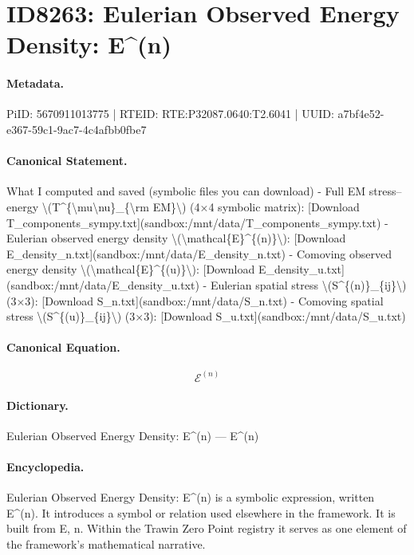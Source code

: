\section*{ID8263: Eulerian Observed Energy Density: E\textasciicircum{}(n)}
\paragraph{Metadata.}
PiID: 5670911013775 | RTEID: RTE:P32087.0640:T2.6041 | UUID: a7bf4e52-e367-59c1-9ac7-4c4afbb0fbe7

\paragraph{Canonical Statement.}
What I computed and saved (symbolic files you can download) - Full EM stress–energy \textbackslash{}(T\textasciicircum{}\{\textbackslash{}mu\textbackslash{}nu\}\_\{\textbackslash{}rm EM\}\textbackslash{}) (4×4 symbolic matrix): [Download T\_components\_sympy.txt](sandbox:/mnt/data/T\_components\_sympy.txt) - Eulerian observed energy density \textbackslash{}(\textbackslash{}mathcal\{E\}\textasciicircum{}\{(n)\}\textbackslash{}): [Download E\_density\_n.txt](sandbox:/mnt/data/E\_density\_n.txt) - Comoving observed energy density \textbackslash{}(\textbackslash{}mathcal\{E\}\textasciicircum{}\{(u)\}\textbackslash{}): [Download E\_density\_u.txt](sandbox:/mnt/data/E\_density\_u.txt) - Eulerian spatial stress \textbackslash{}(S\textasciicircum{}\{(n)\}\_\{ij\}\textbackslash{}) (3×3): [Download S\_n.txt](sandbox:/mnt/data/S\_n.txt) - Comoving spatial stress \textbackslash{}(S\textasciicircum{}\{(u)\}\_\{ij\}\textbackslash{}) (3×3): [Download S\_u.txt](sandbox:/mnt/data/S\_u.txt)

\paragraph{Canonical Equation.}
\[
\mathcal{E}^{(n)}
\]

\paragraph{Dictionary.}
Eulerian Observed Energy Density: E\textasciicircum{}(n) — E\textasciicircum{}(n)

\paragraph{Encyclopedia.}
Eulerian Observed Energy Density: E\textasciicircum{}(n) is a symbolic expression, written E\textasciicircum{}(n). It introduces a symbol or relation used elsewhere in the framework. It is built from E, n. Within the Trawin Zero Point registry it serves as one element of the framework's mathematical narrative.
